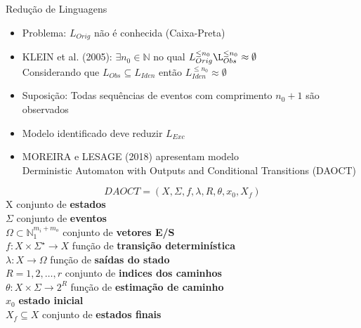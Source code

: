 \begin{frame}{Redução de Linguagens}
\begin{itemize}
\item Problema: $L_{Orig}$ não é conhecida \pause (Caixa-Preta) \pause
\item KLEIN et al. (2005):  $\exists n_0\in\mathbb{N}$ no qual
  $L_{Orig}^{\leq n_0}\L_{Obs}^{\leq n_0}\approx \emptyset $  \pause \\
Considerando que $L_{Obs}\subseteq L_{Iden}$ então  $L_{Iden}^{\leq n_0}\approx \emptyset$ 
\item Suposição: Todas sequências de eventos com comprimento $n_0 + 1$ são observados  \pause
\item Modelo identificado deve reduzir $L_{Exc}$
  \item MOREIRA e LESAGE (2018) apresentam modelo \\Derministic Automaton with
    Outputs and Conditional Transitions (DAOCT) 
\end{itemize}
\end{frame}
\begin{frame}
\begin{definition}[DAOCT]
  \label{def:daoct}
  \small
  \[ DAOCT = (X,\Sigma,f,\lambda,R,\theta, x_0,X_f)\]
  \indent X conjunto de \textbf{estados} \\
  \indent $\Sigma$ conjunto de \textbf{eventos}\\
  \indent $\Omega \subset \mathbb{N}_1^{m_i+m_o} $ conjunto de \textbf{vetores E/S}\\
  \indent $f:  X \times \Sigma^\star \rightarrow X$ função de  \textbf{transição determinística}\\
  \indent $\lambda : X \rightarrow \Omega$ função de  \textbf{saídas do stado}\\
  \indent $R = {1,2,\dots,r}$ conjunto de \textbf{indices dos caminhos}\\
  \indent $\theta : X \times \Sigma \rightarrow 2^R$ função de \textbf{estimação
    de caminho}\\
  \indent $x_0$ \textbf{estado inicial} \\
  \indent $X_f \subseteq X $ conjunto de \textbf{estados finais}
\end{definition}
\end{frame}


